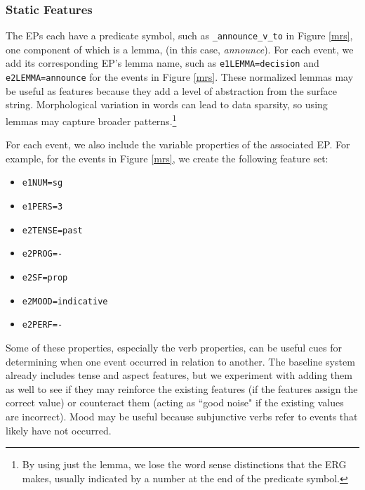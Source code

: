 \documentclass[11pt]{article}
\begin{document}



\subsubsection{Static Features}

The EPs each have a predicate symbol, such as \texttt{\_announce\_v\_to} in Figure \ref{mrs}, one component of which is a lemma, (in this case, \textit{announce}). For each event, we add its corresponding EP's lemma name, such as \texttt{e1LEMMA=decision} and \texttt{e2LEMMA=announce} for the events in Figure \ref{mrs}. These normalized lemmas may be useful as features because they add a level of abstraction from the surface string. Morphological variation in words can lead to data sparsity, so using lemmas may capture broader patterns.\footnote{By using just the lemma, we lose the word sense distinctions that the ERG makes, usually indicated by a number at the end of the predicate symbol.}

For each event, we also include the variable properties of the associated EP. For example, for the events in Figure \ref{mrs}, we create the following feature set:

\begin{itemize}
\setlength\itemsep{-0.5em}
\item \texttt{e1NUM=sg}
\item \texttt{e1PERS=3}
\item \texttt{e2TENSE=past}
\item \texttt{e2PROG=-}
\item \texttt{e2SF=prop}
\item \texttt{e2MOOD=indicative}
\item \texttt{e2PERF=-}
\end{itemize}

Some of these properties, especially the verb properties, can be useful cues for determining when one event occurred in relation to another. The baseline system already includes tense and aspect features, but we experiment with adding them as well to see if they may reinforce the existing features (if the features assign the correct value) or counteract them (acting as ``good noise" if the existing values are incorrect). Mood may be useful because subjunctive verbs refer to events that likely have not occurred.
\end{document}
